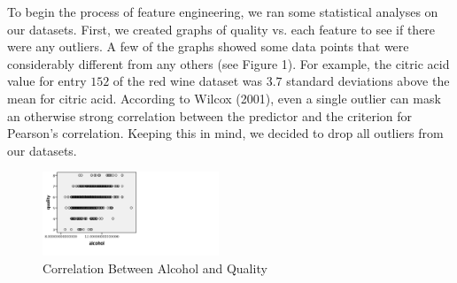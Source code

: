 To begin the process of feature engineering, we ran some statistical analyses on our datasets. First, we created graphs of quality vs. each feature to see if there were any outliers. A few of the graphs showed some data points that were considerably different from any others (see Figure 1). For example, the citric acid value for entry $152$ of the red wine dataset was $3.7$ standard deviations above the mean for citric acid. According to Wilcox (2001), even a single outlier can mask an otherwise strong correlation between the predictor and the criterion for Pearson's correlation. Keeping this in mind, we decided to drop all outliers from our datasets.\\
\begin{figure}[htb]

  \centering  %

  \includegraphics[width=0.47\textwidth]{Picture2.png}

  \caption{Correlation Between Alcohol and Quality}

  \label{fig:tex}

  \end{figure}
  
